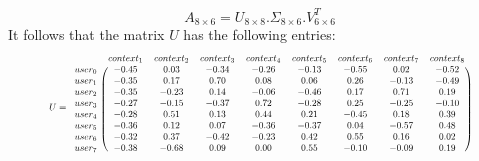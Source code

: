 \documentclass[600paper, 11pt,twoside,openany]{kdp}
\begin{document}
\[A_{8 \times 6}  = U_{8 \times 8} . \Sigma_{8 \times 6} . V^T_{6 \times 6}\]
It follows that the matrix $U$ has the following entries:
\[
\scalebox{.67}{$\displaystyle 
U = 
 \begin{blockarray}{ccccccccc}
& context_1 & context_2 & context_3 & context_4 & context_5 & context_6 & context_7 & context_8\\
\begin{block}{c(cccccccc)}
user_0 & -0.45 & 0.03 & -0.34 & -0.26 & -0.13 & -0.55 &  0.02 & -0.52 \\
user_1 & -0.35 &  0.17 &  0.70 &  0.08 &  0.06 &  0.26 & -0.13 & -0.49 \\
user_2 & -0.35 & -0.23 &  0.14 & -0.06 & -0.46 &  0.17 &  0.71 &  0.19 \\
user_3 & -0.27 & -0.15 & -0.37 &  0.72 & -0.28 &  0.25 & -0.25 & -0.10 \\
user_4 & -0.28 &  0.51 &  0.13 &  0.44 &  0.21 & -0.45 &  0.18 &  0.39\\
user_5 & -0.36 &  0.12 &  0.07 & -0.36 & -0.37 &  0.04 & -0.57 &  0.48\\
user_6 & -0.32&  0.37 & -0.42 & -0.23 &  0.42 &  0.55 &  0.16 &  0.02 \\
user_7 & -0.38 & -0.68 &  0.09 &  0.00 &  0.55 & -0.10 & -0.09 &  0.19 \\
\end{block}
\end{blockarray}
$}
\]
\end{document}
